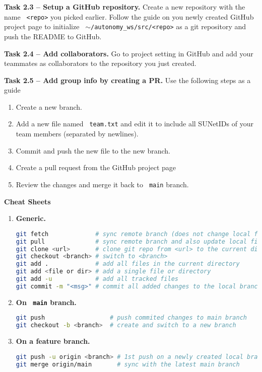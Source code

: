 \documentclass{article}
\def\code#1{\texttt{\color{magenta} #1}}
\begin{document}
{\bf Task 2.3 -- Setup a GitHub repository.} Create a 
new repository with the name \code{<repo>} you picked earlier. Follow the guide on
you newly created GitHub project page to initialize \code{$\sim$/autonomy\_ws/src/<repo>}
as a git repository and push the README to GitHub.

{\bf Task 2.4 -- Add collaborators.} Go to project setting in GitHub and add your teammates
as collaborators to the repository you just created.

{\bf Task 2.5 -- Add group info by creating a PR.} Use the following steps as a guide
\begin{enumerate}
  \item Create a new branch.
  \item Add a new file named \code{team.txt} and edit it to include all SUNetIDs of
    your team members (separated by newlines).
  \item Commit and push the new file to the new branch.
  \item Create a pull request from the GitHub project page
  \item Review the changes and merge it back to \code{main} branch.
\end{enumerate}

{\bf Cheat Sheets}
\begin{enumerate}
\item {\bf Generic.}
\begin{lstlisting}[language=sh]
git fetch             # sync remote branch (does not change local files)
git pull              # sync remote branch and also update local files
git clone <url>       # clone git repo from <url> to the current directory
git checkout <branch> # switch to <branch>
git add .             # add all files in the current directory
git add <file or dir> # add a single file or directory
git add -u            # add all tracked files
git commit -m "<msg>" # commit all added changes to the local branch
\end{lstlisting}

\item {\bf On \code{main} branch.}
\begin{lstlisting}[language=sh]
git push                  # push commited changes to main branch
git checkout -b <branch>  # create and switch to a new branch
\end{lstlisting}

\item {\bf On a feature branch.}
\begin{lstlisting}[language=sh]
git push -u origin <branch> # 1st push on a newly created local branch
git merge origin/main       # sync with the latest main branch
\end{lstlisting}
\end{enumerate}
\end{document}
